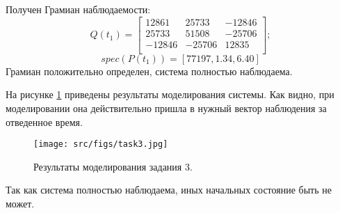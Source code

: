 Получен Грамиан наблюдаемости:
\[
        Q(t_1) = \begin{bmatrix}
        12861 & 25733 & -12846\\
        25733 & 51508 & -25706 \\
        -12846 & -25706 & 12835 \\
        \end{bmatrix};
\]
\[
        spec(P(t_1)) = [77197, 1.34, 6.40]
\]Грамиан положительно определен, система полностью наблюдаема.

На рисунке \ref{fig:task3} приведены результаты моделирования системы. Как видно, при моделировании она действительно пришла в нужный вектор наблюдения за отведенное время.
\begin{figure}[ht!]
        \centering
        \texttt{[image: src/figs/task3.jpg]}
        \caption{Результаты моделирования задания 3.}
        \label{fig:task3}
\end{figure}
Так как система полностью наблюдаема, иных начальных состояние быть не может. 
